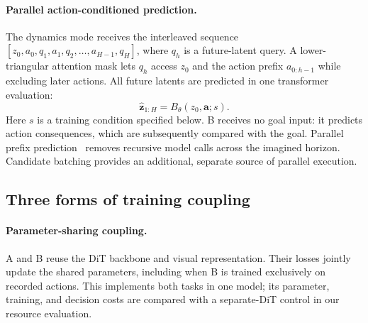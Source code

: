 \paragraph{Parallel action-conditioned prediction.}
The dynamics mode receives the interleaved sequence $[z_0,a_0,q_1,a_1,q_2,\ldots,a_{H-1},q_H]$, where $q_h$ is a future-latent query. A lower-triangular attention mask lets $q_h$ access $z_0$ and the action prefix $a_{0:h-1}$ while excluding later actions. All future latents are predicted in one transformer evaluation:
\begin{equation}
 \hat{\mathbf z}_{1:H}=B_\theta(z_0,\mathbf a;s).
 \label{eq:dynamics}
\end{equation}
Here $s$ is a training condition specified below. B receives no goal input: it predicts action consequences, which are subsequently compared with the goal. Parallel prefix prediction~\cite{gao2026fastlewm} removes recursive model calls across the imagined horizon. Candidate batching provides an additional, separate source of parallel execution.

\subsection{Three forms of training coupling}
\label{sec:coupling}
\paragraph{Parameter-sharing coupling.}
A and B reuse the DiT backbone and visual representation. Their losses jointly update the shared parameters, including when B is trained exclusively on recorded actions. This implements both tasks in one model; its parameter, training, and decision costs are compared with a separate-DiT control in our resource evaluation.

